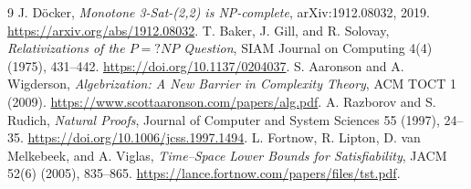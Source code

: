 \documentclass[11pt]{article}
\begin{document}
\begin{thebibliography}{9}
 J. D\"ocker,
\emph{Monotone 3-Sat-(2,2) is NP-complete}, arXiv:1912.08032, 2019.
\url{https://arxiv.org/abs/1912.08032}.
 T. Baker, J. Gill, and R. Solovay,
\emph{Relativizations of the $P=?NP$ Question}, SIAM Journal on Computing
4(4) (1975), 431--442. \url{https://doi.org/10.1137/0204037}.
 S. Aaronson and A. Wigderson,
\emph{Algebrization: A New Barrier in Complexity Theory}, ACM TOCT 1 (2009).
\url{https://www.scottaaronson.com/papers/alg.pdf}.
 A. Razborov and S. Rudich,
\emph{Natural Proofs}, Journal of Computer and System Sciences 55 (1997),
24--35. \url{https://doi.org/10.1006/jcss.1997.1494}.
 L. Fortnow, R. Lipton, D. van Melkebeek, and A. Viglas,
\emph{Time--Space Lower Bounds for Satisfiability}, JACM 52(6) (2005),
835--865. \url{https://lance.fortnow.com/papers/files/tst.pdf}.
\end{thebibliography}

\end{document}
